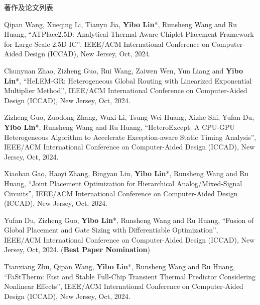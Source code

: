 \begin{rSection}{著作及论文列表}
\begin{description}[font=\normalfont, rightmargin=2em]
\item[{[C164]}]{
        Qipan Wang, Xueqing Li, Tianyu Jia, \textbf{Yibo Lin}*, Runsheng Wang and Ru Huang, 
    ``ATPlace2.5D: Analytical Thermal-Aware Chiplet Placement Framework for Large-Scale 2.5D-IC'', 
    IEEE/ACM International Conference on Computer-Aided Design (ICCAD), New Jersey, Oct, 2024.
    
}
            

\item[{[C163]}]{
        Chunyuan Zhao, Zizheng Guo, Rui Wang, Zaiwen Wen, Yun Liang and \textbf{Yibo Lin}*, 
    ``HeLEM-GR: Heterogeneous Global Routing with Linearized Exponential Multiplier Method'', 
    IEEE/ACM International Conference on Computer-Aided Design (ICCAD), New Jersey, Oct, 2024.
    
}
            

\item[{[C162]}]{
        Zizheng Guo, Zuodong Zhang, Wuxi Li, Tsung-Wei Huang, Xizhe Shi, Yufan Du, \textbf{Yibo Lin}*, Runsheng Wang and Ru Huang, 
    ``HeteroExcept: A CPU-GPU Heterogeneous Algorithm to Accelerate Exception-aware Static Timing Analysis'', 
    IEEE/ACM International Conference on Computer-Aided Design (ICCAD), New Jersey, Oct, 2024.
    
}
            

\item[{[C161]}]{
        Xiaohan Gao, Haoyi Zhang, Bingyan Liu, \textbf{Yibo Lin}*, Runsheng Wang and Ru Huang, 
    ``Joint Placement Optimization for Hierarchical Analog/Mixed-Signal Circuits'', 
    IEEE/ACM International Conference on Computer-Aided Design (ICCAD), New Jersey, Oct, 2024.
    
}
            

\item[{[C160]}]{
        Yufan Du, Zizheng Guo, \textbf{Yibo Lin}*, Runsheng Wang and Ru Huang, 
    ``Fusion of Global Placement and Gate Sizing with Differentiable Optimization'', 
    IEEE/ACM International Conference on Computer-Aided Design (ICCAD), New Jersey, Oct, 2024.
    (\textbf{Best Paper Nomination})
}
            

\item[{[C159]}]{
        Tianxiang Zhu, Qipan Wang, \textbf{Yibo Lin}*, Runsheng Wang and Ru Huang, 
    ``FaStTherm: Fast and Stable Full-Chip Transient Thermal Predictor Considering Nonlinear Effects'', 
    IEEE/ACM International Conference on Computer-Aided Design (ICCAD), New Jersey, Oct, 2024.
    
}
\end{description}
\end{rSection}
